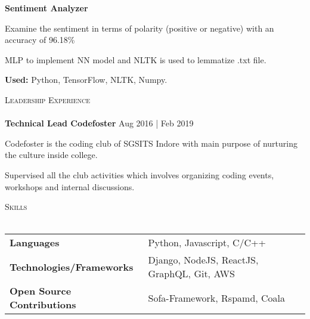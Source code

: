 \documentclass[a4paper]{article}
\newcommand{\lineunder} {
    \vspace*{-8pt} \\
    \hspace*{-18pt} \hrulefill \\
}
\newcommand{\header} [1] {
    {\hspace*{-18pt}\vspace*{6pt} \textsc{#1}}
    \vspace*{-6pt} \lineunder
}
\begin{document}
\textbf{Sentiment Analyzer \href{https://github.com/techytoes/Sentiment-Analyzer}{\faGithub}}
\vspace{-1mm}
\begin{itemize}
	\small{\item Examine the sentiment in terms of polarity (positive or negative) with an accuracy of 96.18\%}
	\small{\item MLP to implement NN model and NLTK is used to lemmatize .txt file.}
	\vspace{-1mm}
	\small{\item \textbf{Used:}  Python, TensorFlow, NLTK, Numpy.}
	\vspace{-1mm}
\end{itemize}

\vspace*{1mm}

\header{Leadership Experience}
\textbf{Technical Lead  \hfill Codefoster} \hfill Aug 2016 | Feb 2019\\
\vspace{-1mm}
\begin{itemize} \itemsep 1pt
	\small{\item Codefoster is the coding club of SGSITS Indore with main purpose of nurturing the culture inside college.}
	\small{\item Supervised all the club activities which involves organizing coding events, workshops and internal discussions.}
\end{itemize}

\header{Skills}
\begin{tabular}{ l l }
	\small{\textbf{Languages}}      & \small{Python, Javascript, C/C++}      \\
	\small{\textbf{Technologies/Frameworks}} 
	&
	 \small{Django, NodeJS, ReactJS, GraphQL, Git, AWS}
	 \\
	\small{\textbf{Open Source Contributions}}      & \small{Sofa-Framework, Rspamd, Coala}               \\
\end{tabular}
\end{document}
